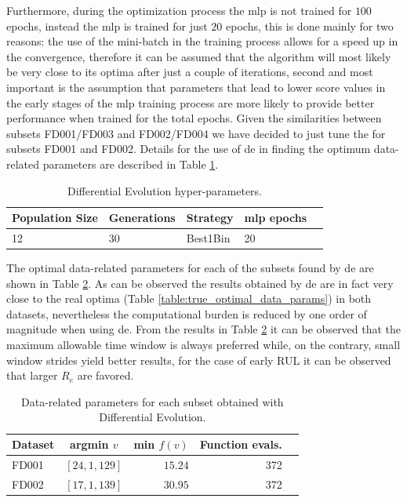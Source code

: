 Furthermore, during the optimization process the \gls{mlp} is not trained for  $100$ epochs, instead the \gls{mlp} is trained for just $20$ epochs, this is done mainly for two reasons: the use of the mini-batch in the training process allows for a speed up in the convergence, therefore it can be assumed that the algorithm will most likely be very close to its optima after just a couple of iterations, second and most important is the assumption that parameters that lead to lower score values in the early stages of the \gls{mlp} training process are more likely to provide better performance when trained for the total epochs. Given the similarities between subsets FD001/FD003 and FD002/FD004 we have decided to just tune the for subsets FD001 and FD002. Details for the use of \gls{de} in finding the optimum data-related parameters are described in Table \ref{table:de_hyperparams}.

\begin{table}[!htb]
\centering
\begin{tabular}{l l l l l}
	\hline
	 Population Size & Generations & Strategy & \gls{mlp} epochs\\
  	\hline
  	12 & 30 & Best1Bin & 20\\
  	\hline
\end{tabular}
\caption{Differential Evolution hyper-parameters.}
\label{table:de_hyperparams}
\end{table}

The optimal data-related parameters for each of the subsets found by \gls{de} are shown in Table \ref{table:optimal_data_params}. As can be observed the results obtained by \gls{de} are in fact very close to the real optima (Table \ref{table:true_optimal_data_params}) in both datasets, nevertheless the computational burden is reduced by one order of magnitude when using \gls{de}. From the results in Table \ref{table:optimal_data_params} it can be observed that the maximum allowable time window is always preferred while, on the contrary, small window strides yield better results, for the case of early RUL it can be observed that larger $R_e$ are favored.

\begin{table}[!htb]
\centering
\begin{tabular}{l | c r r l}
	\hline
	 Dataset & argmin $v$ & min $f(v)$ & Function evals.\\
  	\hline
  	FD001 & $\left[ 24, 1, 129 \right]$ & $15.24$ & 372\\
  	FD002 & $\left[ 17, 1, 139 \right]$ & $30.95$ & 372\\
  	\hline
\end{tabular}
\caption{Data-related parameters for each subset obtained with Differential Evolution.}
\label{table:optimal_data_params}
\end{table}


